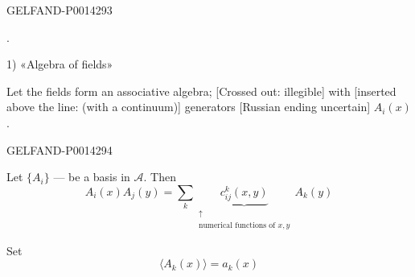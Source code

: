 \begin{GelfandAdjacentEvidence}{GELFAND-P001429}{3}


.

1) «Algebra of fields»

Let the fields form an associative algebra; [Crossed out: illegible]
with [inserted above the line: (with a continuum)] generators [Russian ending uncertain] \(A_i(x)\).
\end{GelfandAdjacentEvidence}
\begin{GelfandAdjacentEvidence}{GELFAND-P001429}{4}

\end{GelfandAdjacentEvidence}


Let \(\{A_i\}\) — be a basis in \(\mathcal A\). Then
\[
A_i(x)A_j(y)=\sum_k
\underset{\substack{\uparrow\\ \text{numerical functions of }x,y}}
  {\underbrace{c_{ij}^k(x,y)}}\,A_k(y)
\]

Set
\[
\langle A_k(x)\rangle=a_k(x)
\]


